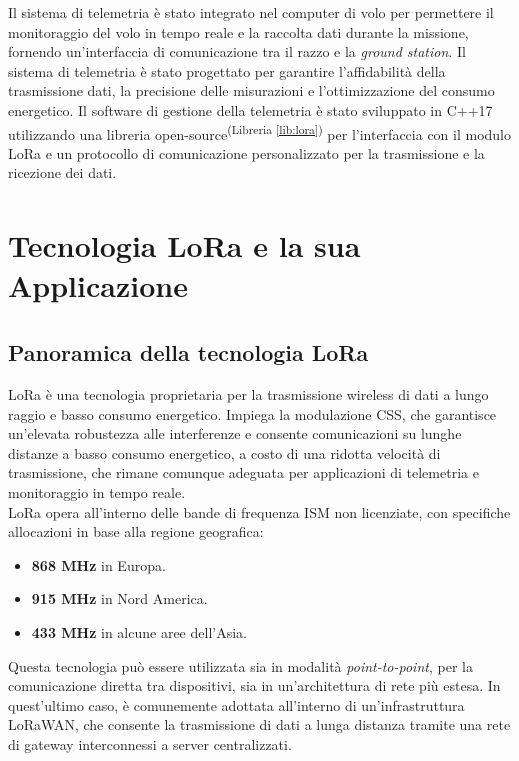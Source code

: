 \documentclass[12pt,a4paper,twoside]{book}
\newcommand{\libref}[1]{\textsuperscript{(Libreria \ref{#1})}}
\begin{document}
Il sistema di telemetria è stato integrato nel computer di volo per permettere il
monitoraggio del volo in tempo reale e la raccolta dati durante la missione,
fornendo un'interfaccia di comunicazione tra il razzo e la \emph{ground station}.
Il sistema di telemetria è stato progettato per garantire l'affidabilità della
trasmissione dati, la precisione delle misurazioni e l'ottimizzazione del consumo
energetico.%
Il software di gestione della telemetria è stato sviluppato in C++17 utilizzando
una libreria open-source\libref{lib:lora} per l'interfaccia con il modulo \ac{LoRa}
e un protocollo di comunicazione personalizzato per la trasmissione e la
ricezione dei dati.

\chapter{Tecnologia \texorpdfstring{LoRa\textsuperscript{\textcopyright}}{} e la sua Applicazione} \label{chap:lora}

\section{Panoramica della tecnologia \texorpdfstring{LoRa\textsuperscript{\textcopyright}}{}}
\ac{LoRa} è una tecnologia proprietaria per la trasmissione wireless di dati a
lungo raggio e basso consumo energetico. Impiega la modulazione \ac{CSS},
che garantisce un'elevata robustezza alle interferenze e consente comunicazioni
su lunghe distanze a basso consumo energetico, a costo di una ridotta velocità di trasmissione,
che rimane comunque adeguata per applicazioni di telemetria e monitoraggio
in tempo reale. \\
\ac{LoRa} opera all'interno delle bande di frequenza \ac{ISM} non licenziate,
con specifiche allocazioni in base alla regione geografica:
\begin{itemize}
    \item \textbf{868 MHz} in Europa.
    \item \textbf{915 MHz} in Nord America.
    \item \textbf{433 MHz} in alcune aree dell’Asia.
\end{itemize}

Questa tecnologia può essere utilizzata sia in modalità \emph{point-to-point},
per la comunicazione diretta tra dispositivi, sia in un’architettura di rete più
estesa. In quest'ultimo caso, è comunemente adottata all'interno di
un'infrastruttura \ac{LoRaWAN}, che consente la trasmissione di dati a lunga
distanza tramite una rete di gateway interconnessi a server centralizzati.
\end{document}
